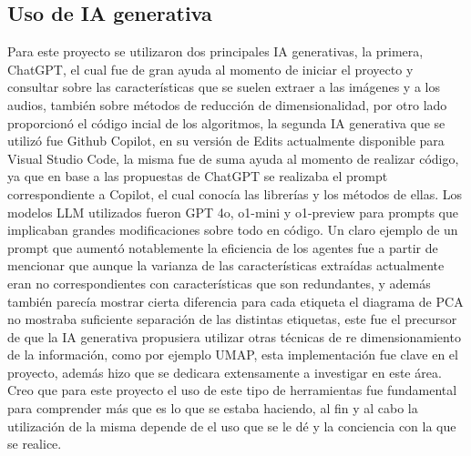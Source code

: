 \documentclass[12pt,a4paper]{article}
\begin{document}
\subsection*{Uso de IA generativa}
Para este proyecto se utilizaron dos principales IA generativas, la primera, ChatGPT, el cual fue de gran ayuda al momento de iniciar el proyecto y consultar sobre las características que se suelen extraer a las imágenes y a los audios, también sobre métodos de reducción de dimensionalidad, por otro lado proporcionó el código incial de los algoritmos, la segunda IA generativa que se utilizó fue Github Copilot, en su versión de Edits actualmente disponible para Visual Studio Code, la misma fue de suma ayuda al momento de realizar código, ya que en base a las propuestas de ChatGPT se realizaba el prompt correspondiente a Copilot, el cual conocía las librerías y los métodos de ellas. Los modelos LLM utilizados fueron GPT 4o, o1-mini y o1-preview para prompts que implicaban grandes modificaciones sobre todo en código.
\newline
Un claro ejemplo de un prompt que aumentó notablemente la eficiencia de los agentes fue a partir de mencionar que aunque la varianza de las características extraídas actualmente eran no correspondientes con características que son redundantes, y además también parecía mostrar cierta diferencia para cada etiqueta el diagrama de PCA no mostraba suficiente separación de las distintas etiquetas, este fue el precursor de que la IA generativa propusiera utilizar otras técnicas de re dimensionamiento de la información, como por ejemplo UMAP, esta implementación fue clave en el proyecto, además hizo que se dedicara extensamente a investigar en este área. 
\newline
Creo que para este proyecto el uso de este tipo de herramientas fue fundamental para comprender más que es lo que se estaba haciendo, al fin y al cabo la utilización de la misma depende de el uso que se le dé y la conciencia con la que se realice.
\newpage











\nocite{*}
\printbibliography
\end{document}
